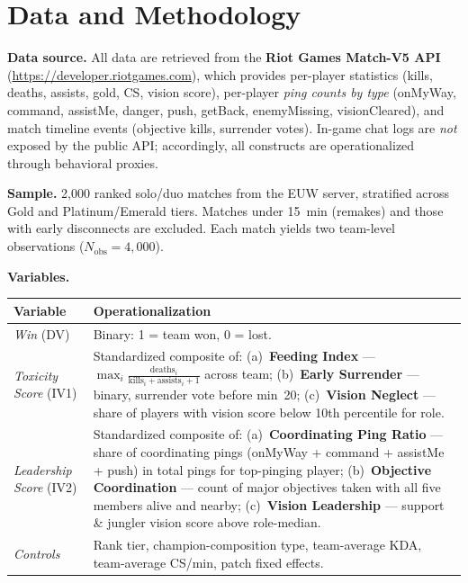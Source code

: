\documentclass[11pt, a4paper]{article}
\begin{document}
\section{Data and Methodology}

\textbf{Data source.}
All data are retrieved from the \textbf{Riot Games Match-V5 API}
(\url{https://developer.riotgames.com}), which provides per-player statistics
(kills, deaths, assists, gold, CS, vision score), per-player \textit{ping counts by
type} (onMyWay, command, assistMe, danger, push, getBack, enemyMissing,
visionCleared), and match timeline events (objective kills, surrender votes).
In-game chat logs are \textit{not} exposed by the public API; accordingly, all
constructs are operationalized through behavioral proxies.

\textbf{Sample.}
2,000 ranked solo/duo matches from the EUW server, stratified across Gold and
Platinum/Emerald tiers. Matches under 15~min (remakes) and those with early
disconnects are excluded. Each match yields two team-level observations
($N_{\text{obs}} = 4{,}000$).

\textbf{Variables.}

\vspace{2pt}
\begin{tabular}{@{}p{3.6cm} p{10.8cm}@{}}
\toprule
\textbf{Variable} & \textbf{Operationalization} \\
\midrule
\textit{Win} (DV) & Binary: 1 = team won, 0 = lost. \\
\textit{Toxicity Score} (IV1) & Standardized composite of: (a)~\textbf{Feeding Index}
  — $\max_i \frac{\text{deaths}_i}{\text{kills}_i+\text{assists}_i+1}$ across team;
  (b)~\textbf{Early Surrender} — binary, surrender vote before min~20;
  (c)~\textbf{Vision Neglect} — share of players with vision score below 10th
  percentile for role. \\
\textit{Leadership Score} (IV2) & Standardized composite of:
  (a)~\textbf{Coordinating Ping Ratio} — share of coordinating pings
  (onMyWay + command + assistMe + push) in total pings for top-pinging player;
  (b)~\textbf{Objective Coordination} — count of major objectives taken with
  all five members alive and nearby;
  (c)~\textbf{Vision Leadership} — support \& jungler vision score above
  role-median. \\
\textit{Controls} & Rank tier, champion-composition type, team-average KDA,
  team-average CS/min, patch fixed effects. \\
\bottomrule
\end{tabular}
\end{document}

